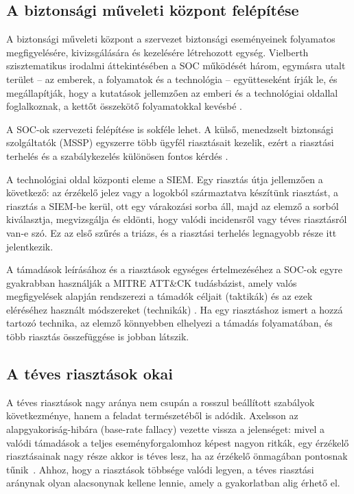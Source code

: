 \subsection{A biztonsági műveleti központ felépítése}\label{sec:soc}
A biztonsági műveleti központ a szervezet biztonsági eseményeinek folyamatos megfigyelésére, kivizsgálására és kezelésére létrehozott egység. Vielberth szisztematikus irodalmi áttekintésében a \ac{SOC} működését három, egymásra utalt terület -- az emberek, a folyamatok és a technológia -- együtteseként írják le, és megállapítják, hogy a kutatások jellemzően az emberi és a technológiai oldallal foglalkoznak, a kettőt összekötő folyamatokkal kevésbé \cite{vielberth2020}.

A \ac{SOC}-ok szervezeti felépítése is sokféle lehet. A külső, menedzselt biztonsági szolgáltatók (MSSP) egyszerre több ügyfél riasztásait kezelik, ezért a riasztási terhelés és a szabálykezelés különösen fontos kérdés \cite{vermeer2023}.

A technológiai oldal központi eleme a \ac{SIEM}. Egy riasztás útja jellemzően a következő: az érzékelő jelez vagy a logokból származtatva készítünk riasztást, a riasztás a \ac{SIEM}-be kerül, ott egy várakozási sorba áll, majd az elemző a sorból kiválasztja, megvizsgálja és eldönti, hogy valódi incidensről vagy téves riasztásról van-e szó. Ez az első szűrés a triázs, és a riasztási terhelés legnagyobb része itt jelentkezik.

A támadások leírásához és a riasztások egységes értelmezéséhez a \ac{SOC}-ok egyre gyakrabban használják a MITRE ATT\&CK tudásbázist, amely valós megfigyelések alapján rendszerezi a támadók céljait (taktikák) és az ezek eléréséhez használt módszereket (technikák) \cite{strom2018attack}. Ha egy riasztáshoz ismert a hozzá tartozó technika, az elemző könnyebben elhelyezi a támadás folyamatában, és több riasztás összefüggése is jobban látszik.


\subsection{A téves riasztások okai}\label{sec:teves}
A téves riasztások nagy aránya nem csupán a rosszul beállított szabályok következménye, hanem a feladat természetéből is adódik. Axelsson az alapgyakoriság-hibára (base-rate fallacy) vezette vissza a jelenséget: mivel a valódi támadások a teljes eseményforgalomhoz képest nagyon ritkák, egy érzékelő riasztásainak nagy része akkor is téves lesz, ha az érzékelő önmagában pontosnak tűnik~\cite{axelsson2000}. Ahhoz, hogy a riasztások többsége valódi legyen, a téves riasztási aránynak olyan alacsonynak kellene lennie, amely a gyakorlatban alig érhető el.

